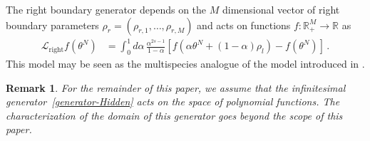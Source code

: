 \documentclass[11pt]{article}
\numberwithin{equation}{section}
\newtheorem{remark}[theorem]{Remark}
\newcommand{\M}{M}
\newcommand{\N}{N}
\newcommand{\ecL}{\bm{\mathscr{L}}}
\newcommand{\hidden}{\theta}
\begin{document}
The right boundary generator depends on the $\M$ dimensional vector of right boundary parameters $\rho_{r}=(\rho_{r,1},\ldots,\rho_{r,\M})$ and acts on functions $f:\mathbb{R}_{+}^{\M}\to \mathbb{R}$ as  
\begin{equation}	\begin{split}
		\ecL_{\text{right}} f(\hidden^{\N})&= \int_0^1d\alpha\,\frac{\alpha ^{2s-1}}{1-\alpha }\left[f(\alpha \hidden^{\N}+(1-\alpha)\rho_{l})-f(\hidden^{\N})\right]\,.
	\end{split}
\end{equation} 
This model may be seen as the multispecies analogue of the   model introduced in \cite{Derkachov:1999pz,2025JSP...192...21G}.
\begin{remark}
    For the remainder of this paper, we assume that the infinitesimal generator~\eqref{generator-Hidden} acts on the space of polynomial functions. 
The characterization of the domain of this generator goes beyond the scope of this paper.
\end{remark}
\end{document}
